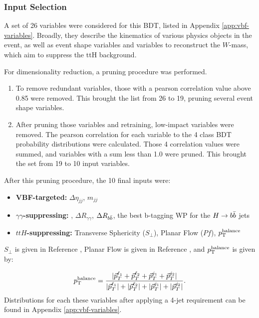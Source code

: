 \subsubsection{Input Selection}
A set of 26 variables were considered for this BDT, listed in Appendix \ref{app:vbf-variables}. Broadly, they describe the kinematics of various physics objects in the event, as well as event shape variables \cite{STDM-2011-33} and variables to reconstruct the $W$-mass, which aim to suppress the ttH background.

For dimensionality reduction, a pruning procedure was performed.
\begin{enumerate}
  \item To remove redundant variables, those with a pearson correlation value above 0.85 were removed. This brought the list from 26 to 19, pruning several event shape variables.
  \item After pruning those variables and retraining, low-impact variables were removed. The pearson correlation for each variable to the 4 class \gls{BDT} probability distributions were calculated. Those 4 correlation values were summed, and variables with a sum less than 1.0 were pruned. This brought the set from 19 to 10 input variables.
\end{enumerate}

After this pruning procedure, the 10 final inputs were: 
\begin{itemize}
\item \textbf{VBF-targeted:} $\Delta \eta_{jj}$, $m_{jj}$

\item \textbf{$\gamma \gamma$-suppressing:} \myybb, $\Delta R_{\gamma\gamma}$, $\Delta R_{b\bar{b}}$, the best b-tagging WP for the $H\rightarrow b\bar{b}$ jets

\item \textbf{$ttH$-suppressing:} Transverse Sphericity ($S_{\perp}$), Planar Flow ($Pf$), $p_{\text{T}}^\text{balance}$
\end{itemize}
%
$S_{\perp}$ is given in Reference \cite{STDM-2011-33}, Planar Flow is given in Reference \cite{planar-flow}, and $p_{\text{T}}^\text{balance}$ is given by:

\begin{equation} \label{eqn:pt-balance}
    p_{\text{T}}^\text{balance} = \frac
    {| \vec{p}_T^{\ell_1} + \vec{p}_T^{\ell_2} + \vec{p}_T^{j_1} +  \vec{p}_T^{j_2}|}
    {|\vec{p}_T^{\ell_1}| + |\vec{p}_T^{\ell_2}| + |\vec{p}_T^{j_1}| +  |\vec{p}_T^{j_2}|}.
\end{equation}
%
Distributions for each these variables after applying a 4-jet requirement can be found in Appendix \ref{app:vbf-variables}. 

